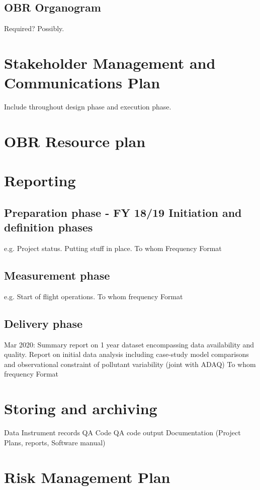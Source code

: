 \documentclass[11pt]{article} %
\begin{document}
\subsection{OBR Organogram}

Required? Possibly.
\newpage
\section{Stakeholder Management and Communications Plan}
Include throughout design phase and execution phase.

\newpage
\section{OBR Resource plan}

\newpage
\section{Reporting}

\subsection{Preparation phase - FY 18/19 Initiation and definition phases}
e.g. Project status. Putting stuff in place.
To whom
Frequency 
Format

\subsection{Measurement phase} 
e.g.  Start of flight operations.
To whom
frequency 
Format

\subsection{Delivery phase} 
Mar 2020: Summary report on 1 year dataset encompassing data availability and quality. Report on initial data analysis including case-study model comparisons and observational constraint of pollutant variability (joint with ADAQ) 
To whom
frequency 
Format

\newpage
\section{Storing and archiving}
Data
Instrument records
QA Code
QA code output
Documentation (Project Plans, reports, Software manual) 

\newpage
\section{Risk Management Plan}
\end{document}

